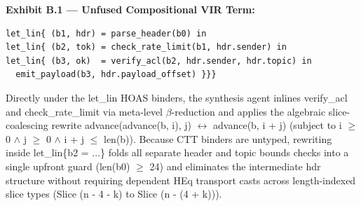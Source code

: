 \par\medskip\noindent\textbf{Exhibit B.1 --- Unfused Compositional VIR Term:}\par\nopagebreak
\begin{lstlisting}
let_lin{ (b1, hdr) = parse_header(b0) in
let_lin{ (b2, tok) = check_rate_limit(b1, hdr.sender) in
let_lin{ (b3, ok)  = verify_acl(b2, hdr.sender, hdr.topic) in
  emit_payload(b3, hdr.payload_offset) }}}
\end{lstlisting}
Directly under the let\_lin HOAS binders, the synthesis agent inlines verify\_acl and check\_rate\_limit via meta-level \ensuremath{\beta}-reduction and applies the algebraic slice-coalescing rewrite advance(advance(b, i), j) \ensuremath{\leftrightarrow} advance(b, i + j) (subject to i \ensuremath{\ge} 0 \ensuremath{\wedge} j \ensuremath{\ge} 0 \ensuremath{\wedge} i + j \ensuremath{\le} len(b)). Because CTT binders are untyped, rewriting inside let\_lin\{b2 = ...\} folds all separate header and topic bounds checks into a single upfront guard (len(b0) \ensuremath{\ge} 24) and eliminates the intermediate hdr structure without requiring dependent HEq transport casts across length-indexed slice types (Slice (n - 4 - k) to Slice (n - (4 + k))).

